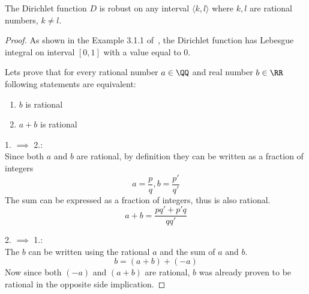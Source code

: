 \begin{lemma}{The Dirichlet function $D$ is robust on any interval $\langle k, l\rangle$
    where $k, l$ are rational numbers, $k\neq l$.}
    \begin{proof}
        As shown in the Example 3.1.1 of~\cite{HONG200565},
        the Dirichlet function has Lebesgue integral
        on interval $[0, 1]$ with a value equal to $0$.

        Lets prove that for every rational number $a\in \QQ$
        and real number $b\in \RR$
        following statements are equivalent:
        \begin{enumerate}\setlength{\itemsep}{0pt}
            \item $b$ is rational
            \item $a+b$ is rational
        \end{enumerate}

        1. $\implies$ 2.:\\
        Since both $a$ and $b$ are rational,
        by definition they can be written as a fraction of integers
        \begin{equation*}
            a = \frac{p}{q}, b = \frac{p'}{q'}
        \end{equation*}
        The sum can be expressed as a fraction of integers,
        thus is also rational.
        \begin{equation*}
            a+b = \frac{pq'+p'q}{qq'}
        \end{equation*}

        2. $\implies$ 1.:\\
        The $b$ can be written using the rational $a$
        and the sum of $a$ and $b$.
        \begin{equation*}
            b = (a+b) + (-a)
        \end{equation*}
        Now since both $(-a)$ and $(a+b)$ are rational,
        $b$ was already proven to be rational in the opposite side implication.


\end{proof}
\end{lemma}
